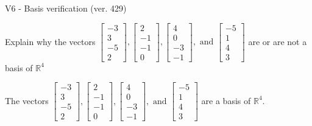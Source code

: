 \begin{exercise}
  \begin{exerciseTitle}V6 - Basis verification (ver. 429)\end{exerciseTitle}
  \begin{exerciseStatement}
    Explain why the vectors \(\left[\begin{array}{r}
-3 \\
3 \\
-5 \\
2
\end{array}\right] , \left[\begin{array}{r}
2 \\
-1 \\
-1 \\
0
\end{array}\right] , \left[\begin{array}{r}
4 \\
0 \\
-3 \\
-1
\end{array}\right] , \text{ and } \left[\begin{array}{r}
-5 \\
1 \\
4 \\
3
\end{array}\right]\) are or are not a basis of \(\mathbb{R}^4\)	


  \end{exerciseStatement}
  \begin{exerciseAnswer}
   The vectors \(\left[\begin{array}{r}
-3 \\
3 \\
-5 \\
2
\end{array}\right] , \left[\begin{array}{r}
2 \\
-1 \\
-1 \\
0
\end{array}\right] , \left[\begin{array}{r}
4 \\
0 \\
-3 \\
-1
\end{array}\right] , \text{ and } \left[\begin{array}{r}
-5 \\
1 \\
4 \\
3
\end{array}\right]\) 
  	 are  a basis of \(\mathbb{R}^4\).
  


  \end{exerciseAnswer}
\end{exercise}